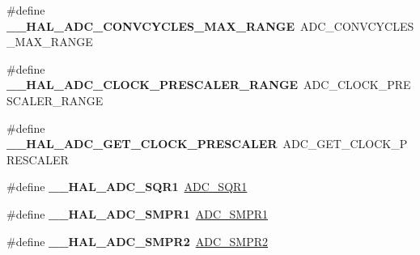 \begin{DoxyCompactItemize}
\item 
\mbox{\label{group___h_a_l___a_d_c___aliased___macros_gaffcdf78845300c37812650611d2915b4}} 
\#define {\bfseries \+\_\+\+\_\+\+H\+A\+L\+\_\+\+A\+D\+C\+\_\+\+C\+O\+N\+V\+C\+Y\+C\+L\+E\+S\+\_\+\+M\+A\+X\+\_\+\+R\+A\+N\+GE}~A\+D\+C\+\_\+\+C\+O\+N\+V\+C\+Y\+C\+L\+E\+S\+\_\+\+M\+A\+X\+\_\+\+R\+A\+N\+GE
\item 
\mbox{\label{group___h_a_l___a_d_c___aliased___macros_gad371b9c9ce847537972a0bc6c1422c45}} 
\#define {\bfseries \+\_\+\+\_\+\+H\+A\+L\+\_\+\+A\+D\+C\+\_\+\+C\+L\+O\+C\+K\+\_\+\+P\+R\+E\+S\+C\+A\+L\+E\+R\+\_\+\+R\+A\+N\+GE}~A\+D\+C\+\_\+\+C\+L\+O\+C\+K\+\_\+\+P\+R\+E\+S\+C\+A\+L\+E\+R\+\_\+\+R\+A\+N\+GE
\item 
\mbox{\label{group___h_a_l___a_d_c___aliased___macros_ga0595fba00a50ea5ba7b8baf4cbdd6820}} 
\#define {\bfseries \+\_\+\+\_\+\+H\+A\+L\+\_\+\+A\+D\+C\+\_\+\+G\+E\+T\+\_\+\+C\+L\+O\+C\+K\+\_\+\+P\+R\+E\+S\+C\+A\+L\+ER}~A\+D\+C\+\_\+\+G\+E\+T\+\_\+\+C\+L\+O\+C\+K\+\_\+\+P\+R\+E\+S\+C\+A\+L\+ER
\item 
\mbox{\label{group___h_a_l___a_d_c___aliased___macros_ga7355b4d9c49af127fdb5a1dd7e8b66f0}} 
\#define {\bfseries \+\_\+\+\_\+\+H\+A\+L\+\_\+\+A\+D\+C\+\_\+\+S\+Q\+R1}~\mbox{\hyperlink{group___a_d_c___private___macros_ga1958741688a480069df9ab5e15be93ca}{A\+D\+C\+\_\+\+S\+Q\+R1}}
\item 
\mbox{\label{group___h_a_l___a_d_c___aliased___macros_gad8e081521ef7ee963c7833376f52dbfd}} 
\#define {\bfseries \+\_\+\+\_\+\+H\+A\+L\+\_\+\+A\+D\+C\+\_\+\+S\+M\+P\+R1}~\mbox{\hyperlink{group___a_d_c___private___macros_ga29f7414128fbbdb81db6ea6ede449f4b}{A\+D\+C\+\_\+\+S\+M\+P\+R1}}
\item 
\mbox{\label{group___h_a_l___a_d_c___aliased___macros_gabd50880ede02b19440d1dbc549b19e8f}} 
\#define {\bfseries \+\_\+\+\_\+\+H\+A\+L\+\_\+\+A\+D\+C\+\_\+\+S\+M\+P\+R2}~\mbox{\hyperlink{group___a_d_c___private___macros_gaeb66714538d978d4d336a4a6ef0d58bc}{A\+D\+C\+\_\+\+S\+M\+P\+R2}}
\item 

\end{DoxyCompactItemize}

